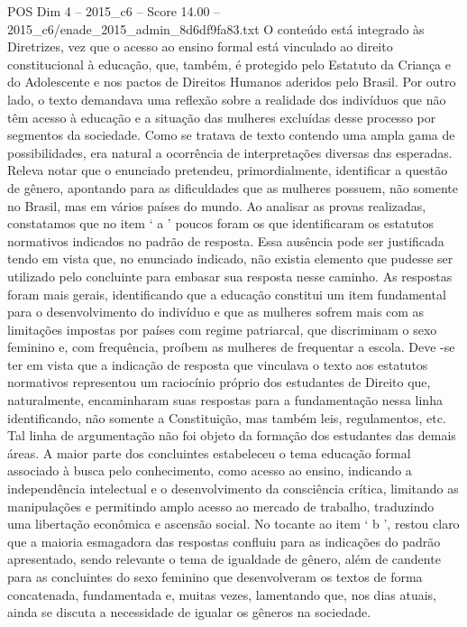 \begin{textsample}{POS Dim 4 – 2015\_c6 – Score 14.00 – 2015\_c6/enade\_2015\_admin\_8d6df9fa83.txt}
O conteúdo está integrado às Diretrizes, vez que o acesso ao ensino formal está vinculado ao direito constitucional à educação, que, também, é protegido pelo Estatuto da Criança e do Adolescente e nos pactos de Direitos Humanos aderidos pelo Brasil.
Por outro lado, o texto demandava uma reflexão sobre a realidade dos indivíduos que não têm acesso à educação e a situação das mulheres excluídas desse processo por segmentos da sociedade.
Como se tratava de texto contendo uma ampla gama de possibilidades, era natural a ocorrência de interpretações diversas das esperadas.
Releva notar que o enunciado pretendeu, primordialmente, identificar a questão de gênero, apontando para as dificuldades que as mulheres possuem, não somente no Brasil, mas em vários países do mundo.
Ao analisar as provas realizadas, constatamos que no item ‘ a ’ poucos foram os que identificaram os estatutos normativos indicados no padrão de resposta.
Essa ausência pode ser justificada tendo em vista que, no enunciado indicado, não existia elemento que pudesse ser utilizado pelo concluinte para embasar sua resposta nesse caminho.
As respostas foram mais gerais, identificando que a educação constitui um item fundamental para o desenvolvimento do indivíduo e que as mulheres sofrem mais com as limitações impostas por países com regime patriarcal, que discriminam o sexo feminino e, com frequência, proíbem as mulheres de frequentar a escola.
Deve -se ter em vista que a indicação de resposta que vinculava o texto aos estatutos normativos representou um raciocínio próprio dos estudantes de Direito que, naturalmente, encaminharam suas respostas para a fundamentação nessa linha identificando, não somente a Constituição, mas também leis, regulamentos, etc.
Tal linha de argumentação não foi objeto da formação dos estudantes das demais áreas.
A maior parte dos concluintes estabeleceu o tema educação formal associado à busca pelo conhecimento, como acesso ao ensino, indicando a independência intelectual e o desenvolvimento da consciência crítica, limitando as manipulações e permitindo amplo acesso ao mercado de trabalho, traduzindo uma libertação econômica e ascensão social.
No tocante ao item ‘ b ’, restou claro que a maioria esmagadora das respostas confluiu para as indicações do padrão apresentado, sendo relevante o tema de igualdade de gênero, além de candente para as concluintes do sexo feminino que desenvolveram os textos de forma concatenada, fundamentada e, muitas vezes, lamentando que, nos dias atuais, ainda se discuta a necessidade de igualar os gêneros na sociedade.

\end{textsample}
